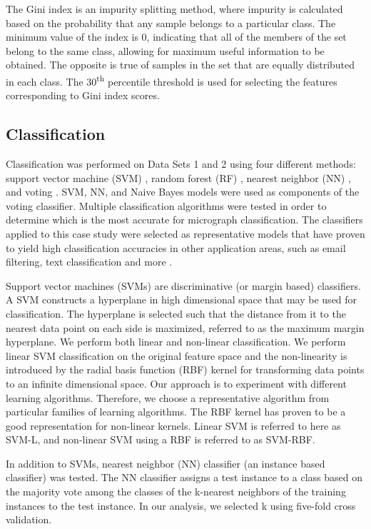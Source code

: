 The Gini index \cite{gini} is an impurity splitting method, where impurity is calculated based on the probability that any sample belongs to a particular class. The minimum value of the index is 0, indicating that all of the members of the set belong to the same class, allowing for maximum useful information to be obtained. The opposite is true of samples in the set that are equally distributed in each class. The 30\textsuperscript{th} percentile threshold is used for selecting the features corresponding to Gini index scores.

\subsection{Classification}
\label{classification}

Classification was performed on Data Sets 1 and 2 using four different methods: support vector machine (SVM) \cite{svm}, random forest (RF)  \cite{rf}, nearest neighbor (NN)  \cite{nn}, and voting  \cite{voting}. SVM, NN, and Naive Bayes \cite{nb} models were used as components of the voting classifier.  Multiple classification algorithms were tested in order to determine which is the most accurate for micrograph classification. The classifiers applied to this case study were selected as representative models that have proven to yield high classification accuracies in other application areas, such as email filtering, text classification and more \cite{Kotsiantis2007}.  

Support vector machines (SVMs) \cite{svm} are discriminative (or margin based) classifiers. A SVM constructs a hyperplane in high dimensional space that may be used for classification. The hyperplane is selected such that the distance from it to the nearest data point on each side is maximized, referred to as the maximum margin hyperplane. We perform both linear and non-linear classification. We perform linear SVM classification on the original feature space and the non-linearity is introduced by the radial basis function (RBF) kernel for transforming data points to an infinite dimensional space. Our approach is to experiment with different learning algorithms. Therefore, we choose a representative algorithm from particular families of learning algorithms. The RBF kernel has proven to be a good representation for non-linear kernels. Linear SVM is referred to here as SVM-L, and non-linear SVM using a RBF is referred to as SVM-RBF.   

In addition to SVMs, nearest neighbor (NN) \cite{nn} classifier (an instance based classifier) was tested. The NN classifier assigns a test instance to a class based on the majority vote among the classes of the k-nearest neighbors of the training instances to the test instance. In our analysis, we selected k using five-fold cross validation. 

